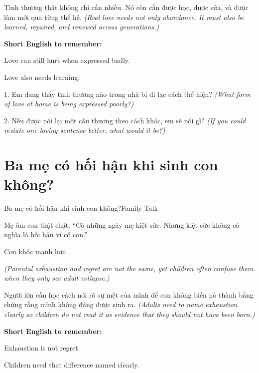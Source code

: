 \begin{baihoc}
Tình thương thật không chỉ cần nhiều. Nó còn cần được học, được sửa, và được làm mới qua từng thế hệ.
\textit{(Real love needs not only abundance. It must also be learned, repaired, and renewed across generations.)}
\end{baihoc}

\begin{ghinhoanh}
\textbf{Short English to remember:}

Love can still hurt when expressed badly.

Love also needs learning.
\end{ghinhoanh}

\begin{tuhocnhanh}
1. Em đang thấy tình thương nào trong nhà bị đi lạc cách thể hiện? \textit{(What form of love at home is being expressed poorly?)}

2. Nếu được nói lại một câu thương theo cách khác, em sẽ nói gì? \textit{(If you could restate one loving sentence better, what would it be?)}
\end{tuhocnhanh}
\ngancach

\section{Ba mẹ có hối hận khi sinh con không?}
\begin{truyen}{Ba mẹ có hối hận khi sinh con không?}{Family Talk}

Mẹ ôm con thật chặt: ``Có những ngày mẹ kiệt sức. Nhưng kiệt sức không có nghĩa là hối hận vì có con.''

Con khóc mạnh hơn.

\textit{(Parental exhaustion and regret are not the same, yet children often confuse them when they only see adult collapse.)}
\end{truyen}

\begin{baihoc}
Người lớn cần học cách nói rõ sự mệt của mình để con không biến nó thành bằng chứng rằng mình không đáng được sinh ra.
\textit{(Adults need to name exhaustion clearly so children do not read it as evidence that they should not have been born.)}
\end{baihoc}

\begin{ghinhoanh}
\textbf{Short English to remember:}

Exhaustion is not regret.

Children need that difference named clearly.
\end{ghinhoanh}


